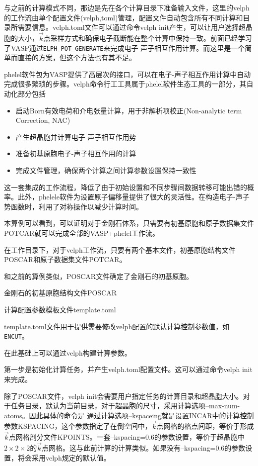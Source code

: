 {与之前的计算模式不同，那边是先在各个计算目录下准备输入文件，这里的\textrm{velph}的工作流由单个配置文件\textrm{(velph,toml)}管理，配置文件自动包含所有不同计算和目录所需要信息。\textrm{velph.toml}文件可以通过命令\textrm{velph init}产生，可以让用户选择超晶胞的大小，$\vec k$点采样方式和确保电子截断能在整个计算中保持一致。前面已经学习了\textrm{VASP}通过\texttt{ELPH\_POT\_GENERATE}来完成电子-声子相互作用计算。而这里是一个简单而直接的方案，但这个方法也有其不足。

\textrm{phelel}软件包为\textrm{VASP}提供了高层次的接口，可以在电子-声子相互作用计算中自动完成很多繁琐的步骤。\textrm{velph}命令行工工具属于\textrm{phelel}软件生态工具的一部分，其自动化部分包括
\begin{itemize}
	\item 启动\textrm{Born}有效电荷和介电张量计算，用于非解析项校正\textrm{(Non-analytic term Correction, NAC)}
	\item 产生超晶胞并计算电子-声子相互作用势
	\item 准备初基原胞电子-声子相互作用的计算
	\item 完成文件管理，确保两个计算之间计算参数设置保持一致性
\end{itemize}
这一套集成的工作流程，降低了由于初始设置和不同步骤间数据转移可能出错的概率。此外，\textrm{phelele}软件为设置原子偏移量提供了很大的灵活性。在构造电子-声子势函数时，利用了对称操作以减少计算时间。

本算例可以看到，可以证明对于金刚石体系，只需要有初基原胞和原子数据集文件\textrm{POTCAR}就可以完成全部的\textrm{VASP+phelel}工作流。

在工作目录下，对于\textrm{velph}工作流，只要有两个基本文件，初基原胞结构文件\textrm{POSCAR}和原子数据集文件\textrm{POTCAR}。

和之前的算例类似，\textrm{POSCAR}文件确定了金刚石的初基原胞。

金刚石的初基原胞结构文件\textrm{POSCAR}

计算配置参数模板文件\textrm{template.toml}

\textrm{template.toml}文件用于提供需要修改\textrm{velph}配置的默认计算控制参数值，如\texttt{ENCUT}。

在此基础上可以通过\textrm{velph}构建计算参数。%

第一步是初始化计算任务，并产生\textrm{velph.toml}配置文件。这可以通过命令\textrm{velph init}来完成。%

除了\textrm{POSCAR}文件，\textrm{velph init}会需要用户指定任务的计算目录和超晶胞大小。对于任务目录，默认为当前目录，对于超晶胞的尺寸，采用计算选项\textrm{--max-num-atoms}。因此具体的命令是
通过计算选项\textrm{--kspaceing}就是设置\textrm{INCAR}中的计算控制参数\textrm{KSPACING}，这个参数指定了在倒空间中，$\vec k$点网格的格点间距，等价于形成$\vec k$点网格剖分文件\textrm{KPOINTS}。一套\textrm{--kspacing=0.6}的参数设置，等价于超晶胞中$2\times2\times2$的$\vec k$点网格。这与此前计算的计算类似。如果没有{--kspacing=0.6}的参数设置，将会采用\textrm{velph}规定的默认值。

}
